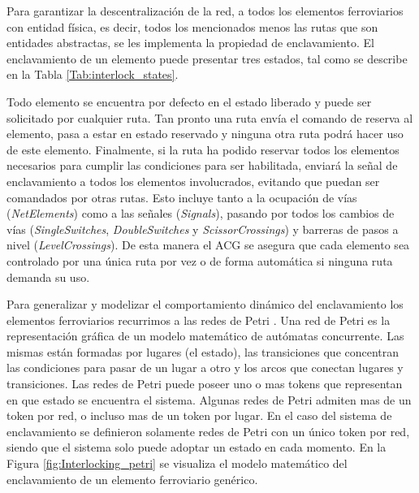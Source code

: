 	Para garantizar la descentralización de la red, a todos los elementos ferroviarios con entidad física, es decir, todos los mencionados menos las rutas que son entidades abstractas, se les implementa la propiedad de enclavamiento. El enclavamiento de un elemento puede presentar tres estados, tal como se describe en la Tabla \ref{Tab:interlock_states}.
	
		\begin{table}[!h]
		{
			\caption{Estados de enclavamiento de cada elemento ferroviario.}
			\label{Tab:interlock_states}
			\centering
		}
		\end{table}
	
	Todo elemento se encuentra por defecto en el estado liberado y puede ser solicitado por cualquier ruta. Tan pronto una ruta envía el comando de reserva al elemento, pasa a estar en estado reservado y ninguna otra ruta podrá hacer uso de este elemento. Finalmente, si la ruta ha podido reservar todos los elementos necesarios para cumplir las condiciones para ser habilitada, enviará la señal de enclavamiento a todos los elementos involucrados, evitando que puedan ser comandados por otras rutas. Esto incluye tanto a la ocupación de vías (\textit{NetElements}) como a las señales (\textit{Signals}), pasando por todos los cambios de vías (\textit{SingleSwitches}, \textit{DoubleSwitches} y \textit{ScissorCrossings}) y barreras de pasos a nivel (\textit{LevelCrossings}). De esta manera el ACG se asegura que cada elemento sea controlado por una única ruta por vez o de forma automática si ninguna ruta demanda su uso.
	
	Para generalizar y modelizar el comportamiento dinámico del enclavamiento los elementos ferroviarios recurrimos a las redes de Petri \cite{Paper_64,Paper_65,Paper_88,Paper_94,Paper_95,Paper_123,Paper_196}. Una red de Petri es la representación gráfica de un modelo matemático de autómatas concurrente. Las mismas están formadas por lugares (el estado), las transiciones que concentran las condiciones para pasar de un lugar a otro y los arcos que conectan lugares y transiciones. Las redes de Petri puede poseer uno o mas tokens que representan en que estado se encuentra el sistema. Algunas redes de Petri admiten mas de un token por red, o incluso mas de un token por lugar. En el caso del sistema de enclavamiento se definieron solamente redes de Petri con un único token por red, siendo que el sistema solo puede adoptar un estado en cada momento. En la Figura \ref{fig:Interlocking_petri} se visualiza el modelo matemático del enclavamiento de un elemento ferroviario genérico.
	
